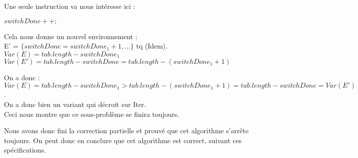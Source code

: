 Une seule instruction va nous intéresse ici : \\

\begin{center}
  $switchDone++;$\\
 \end{center} 
 
Cela nous donne un nouvel environnement :\\

E' = $\{switchDone = switchDone_{1}+1, ...\}$ tq (Idem).\\

$Var(E) = tab.length - switchDone_{1}$
$Var(E') = tab.length - switchDone = tab.length - (switchDone_{1}+1)$

On a donc : $Var(E) = tab.length - switchDone_{1} > tab.length - (switchDone_1 +1) = tab.length - switchDone = Var(E')$.\\

On a donc bien un variant qui décroit sur Iter.\\

Ceci nous montre que ce sous-problème se finira toujours. 

Nous avons donc fini la correction partielle et prouvé que cet algorithme s'arrête toujours. On peut donc en conclure que cet algorithme est correct, suivant ces spécifications. \\




